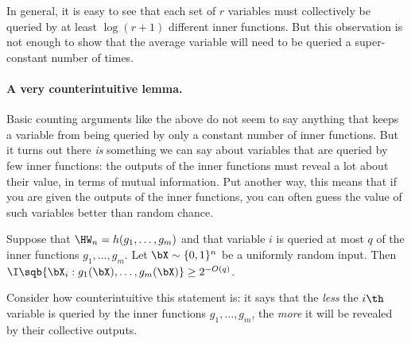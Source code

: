 In general, it is easy to see that each set of $r$ variables must collectively be queried by at least $\log(r+1)$ different inner functions.
But this observation is not enough to show that the average variable will need to be queried a super-constant number of times.

\paragraph*{A very counterintuitive lemma.}
Basic counting arguments like the above do not seem to say anything that keeps a variable from being queried by only a constant number of inner functions.
But it turns out there \emph{is} something we can say about variables that are queried by few inner functions: the outputs of the inner functions must reveal a lot about their value, in terms of mutual information.
Put another way, this means that if you are given the outputs of the inner functions, you can often guess the value of such variables better than random chance.

\begin{lemma}
\label{lemma:main}
Suppose that $\HW_n = h(g_1, \ldots, g_m)$ and that variable $i$ is queried at most $q$ of the inner functions $g_1, \ldots, g_m$.
Let $\bX \sim \{0,1\}^n$ be a uniformly random input.
Then $\I\sqb{\bX_i:g_1(\bX), \ldots, g_m(\bX)} \geq 2^{-O(q)}$.
\end{lemma}

Consider how counterintuitive this statement is: it says that the \emph{less} the $i\th$ variable is queried by the inner functions $g_1, 
\ldots, g_m$, the \emph{more} it will be revealed by their collective outputs.



